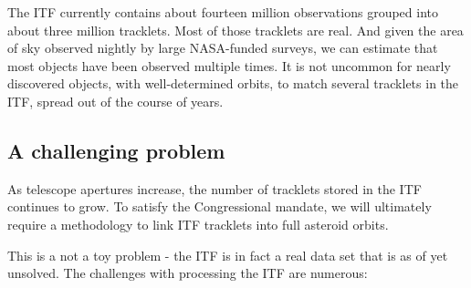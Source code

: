 \documentclass[11pt,letter]{article}
\begin{document}
The ITF currently contains about fourteen million observations grouped into about three million tracklets.  Most of those tracklets are real.  And given the area of sky observed nightly by large NASA-funded surveys, we can estimate that most objects have been observed multiple times.  It is not uncommon for nearly discovered objects, with well-determined orbits, to match several tracklets in the ITF, spread out of the course of years.  

\subsection*{A challenging problem}
As telescope apertures increase, the number of tracklets stored in the ITF continues to grow.  To satisfy the Congressional mandate, we will ultimately require a methodology to link ITF tracklets into full asteroid orbits.

This is a not a toy problem - the ITF is in fact a real data set that is as of yet unsolved.  The challenges with processing the ITF are numerous:
\end{document}
